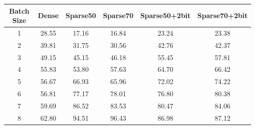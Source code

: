 \begin{tabular}{cccccc}
    \toprule
    Batch Size & Dense & Sparse50 & Sparse70 & Sparse50+2bit & Sparse70+2bit \\
    \midrule
    1 & 28.55 & 17.16 & 16.84 & 23.24 & 23.38 \\
    2 & 39.81 & 31.75 & 30.56 & 42.76 & 42.37 \\
    3 & 49.15 & 45.15 & 46.18 & 55.45 & 57.81 \\
    4 & 55.83 & 53.80 & 57.63 & 64.70 & 66.42 \\
    5 & 56.67 & 66.93 & 65.96 & 72.02 & 74.22 \\
    6 & 56.81 & 77.17 & 78.01 & 76.80 & 80.38 \\
    7 & 59.69 & 86.52 & 83.53 & 80.47 & 84.06 \\
    8 & 62.80 & 94.51 & 96.43 & 86.98 & 87.12 \\
    \bottomrule
\end{tabular}
